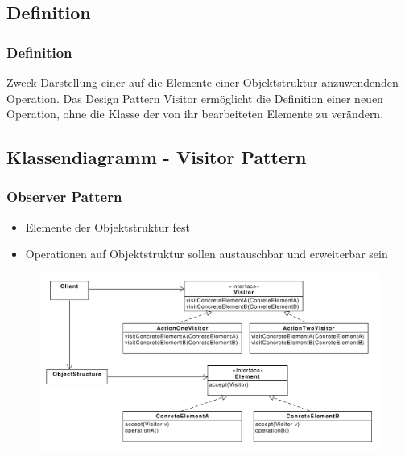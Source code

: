 \subsection{Definition}
\begin{frame}
  \frametitle{Definition}
  \begin{block}{Zweck}
  	Darstellung einer auf die Elemente einer Objektstruktur anzuwendenden Operation. Das
Design Pattern Visitor ermöglicht die Definition einer neuen Operation, ohne die Klasse der
von ihr bearbeiteten Elemente zu verändern.
  \end{block}
  
\end{frame}

\subsection{Klassendiagramm - Visitor Pattern}
\begin{frame}
	\frametitle{Observer Pattern}		
	\begin{itemize}
		\item Elemente der Objektstruktur fest
		\item Operationen auf Objektstruktur sollen austauschbar und erweiterbar sein
	\end{itemize}	
  	\begin{figure}
		\includegraphics[scale=.3]{paper/visitor/visitor}
	\end{figure}
\end{frame}

